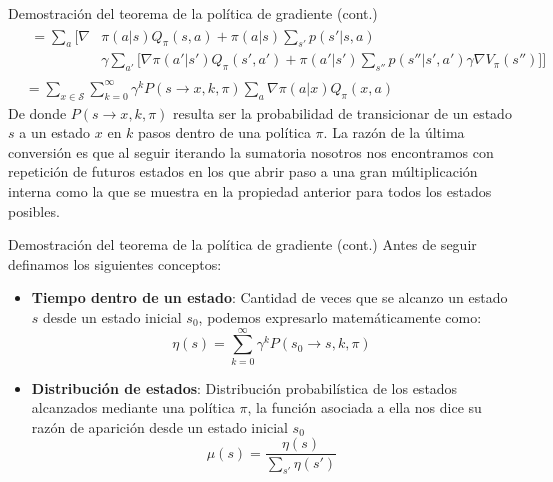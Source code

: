 \documentclass[10pt]{beamer}
\begin{document}
		\begin{frame}{Demostración del teorema de la política de gradiente (cont.)}
			\[
			\begin{aligned}
				&\begin{aligned}
					= \sum_a \Bigg[ \nabla &\pi(a | s) Q_\pi(s,a) + \pi(a | s) \sum_{s'} p(s' | s, a) \\
					&\gamma \sum_{a'} \Big[ \nabla \pi(a' | s') Q_\pi(s',a') + \pi(a' | s') \sum_{s''} p(s'' | s', a') \gamma \nabla V_\pi(s'') \Big] \Bigg] 
				\end{aligned} \\
				&= \sum_{x \in \mathcal{S}} \sum_{k=0}^\infty \gamma^k P(s \rightarrow x, k, \pi) \sum_{a} \nabla \pi(a | x) Q_\pi (x, a)
			\end{aligned}
			\]
			De donde $P(s \rightarrow x, k, \pi)$ resulta ser la probabilidad de transicionar de un estado $s$ a un estado $x$ en $k$ pasos dentro de una política $\pi$. La razón de 
			la última conversión es que al seguir iterando la sumatoria nosotros nos encontramos con repetición de futuros estados en los que abrir paso a una gran múltiplicación interna como la que se muestra en la propiedad anterior para todos los estados posibles.
		\end{frame}

		\begin{frame}{Demostración del teorema de la política de gradiente (cont.)}
			Antes de seguir definamos los siguientes conceptos:

			\begin{itemize}
				\item \textbf{Tiempo dentro de un estado}: Cantidad de veces que se alcanzo un estado $s$ desde un estado inicial $s_0$, podemos expresarlo matemáticamente como:
				\[
				\eta(s) = \sum_{k=0}^\infty \gamma^k P(s_0 \rightarrow s, k, \pi)
				\]
				\item \textbf{Distribución de estados}: Distribución probabilística de los estados alcanzados mediante una política $\pi$, la función asociada a ella nos dice su razón de aparición desde un estado inicial $s_0$
				\[
				\mu(s) = \frac{\eta(s)}{\sum_{s'}\eta(s')}
				\]
			\end{itemize}
		\end{frame}
\end{document}

